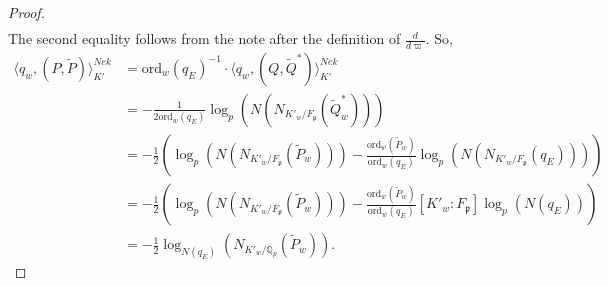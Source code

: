 \documentclass[reqno,10pt]{amsart}
\newcommand{\qp}{\mathbb{Q}_{p}}
\newcommand{\p}{\mathfrak{p}}
\newcommand{\vp}{\varpi}
\newcommand{\tp}{\widetilde{P}}
\newcommand{\wq}{\widetilde{Q}}
\theoremstyle{plain}
\theoremstyle{definition}
\begin{document}
\begin{proof}
\begin{align*}
    \end{align*}
    The second equality follows from the note after the definition of $\frac{d}{d\vp}$. So,
    \begin{align*}
        \langle q_w,(P,\widetilde{P}) \rangle^{Nek}_{K'} & = \mathrm{ord}_w(q_E)^{-1} \cdot \langle q_w,(Q,\wq^*) \rangle^{Nek}_{K'} \\
        & = -\frac{1}{2\mathrm{ord}_w(q_E)} \log_p(N(N_{K'_w/F_\p}(\wq_w^*))) \\
        & = -\frac{1}{2} \left(\log_p(N(N_{K'_w/F_\p}(\tp_w))) - \frac{\mathrm{ord}_w(\tp_w)}{\mathrm{ord}_w(q_E)} \log_p(N(N_{K'_w/F_\p}(q_E))) \right) \\
        & = -\frac{1}{2} \left(\log_p(N(N_{K'_w/F_\p}(\tp_w))) - \frac{\mathrm{ord}_w(\tp_w)}{\mathrm{ord}_w(q_E)} [K'_w:F_\p] \log_p(N(q_E)) \right) \\
        & = -\frac{1}{2} \log_{N(q_E)}(N_{K'_w/\qp}(\tp_w)).
    \end{align*}
\end{proof}
\end{document}
